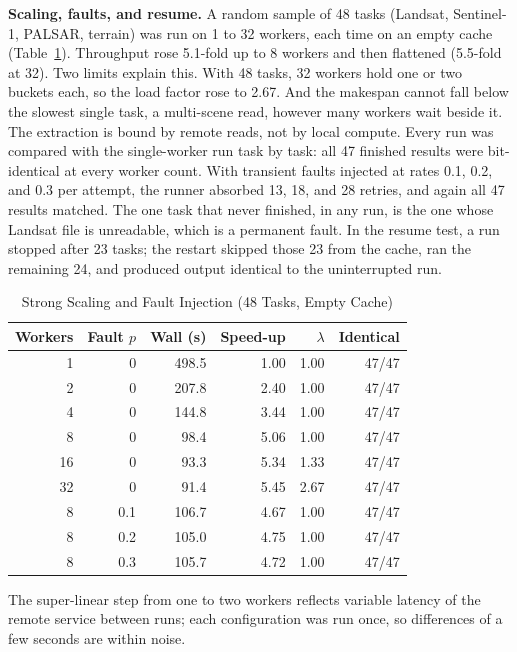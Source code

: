 \documentclass[conference,a4paper]{IEEEtran}
\begin{document}
\textbf{Scaling, faults, and resume.} A random sample of 48 tasks (Landsat, Sentinel-1, PALSAR, terrain) was run on 1 to 32 workers, each time on an empty cache (Table~\ref{tab:sys}). Throughput rose 5.1-fold up to 8 workers and then flattened (5.5-fold at 32). Two limits explain this. With 48 tasks, 32 workers hold one or two buckets each, so the load factor rose to 2.67. And the makespan cannot fall below the slowest single task, a multi-scene read, however many workers wait beside it. The extraction is bound by remote reads, not by local compute. Every run was compared with the single-worker run task by task: all 47 finished results were bit-identical at every worker count. With transient faults injected at rates 0.1, 0.2, and 0.3 per attempt, the runner absorbed 13, 18, and 28 retries, and again all 47 results matched. The one task that never finished, in any run, is the one whose Landsat file is unreadable, which is a permanent fault. In the resume test, a run stopped after 23 tasks; the restart skipped those 23 from the cache, ran the remaining 24, and produced output identical to the uninterrupted run.

\begin{table}[t]
\centering
\caption{Strong Scaling and Fault Injection (48 Tasks, Empty Cache)}
\label{tab:sys}
\footnotesize
\setlength{\tabcolsep}{4pt}
\begin{tabular}{@{}r r r r r r@{}}
\toprule
\textbf{Workers} & \textbf{Fault $p$} & \textbf{Wall (s)} & \textbf{Speed-up} & $\lambda$ & \textbf{Identical}\\
\midrule
1 & 0 & 498.5 & 1.00 & 1.00 & 47/47\\
2 & 0 & 207.8 & 2.40 & 1.00 & 47/47\\
4 & 0 & 144.8 & 3.44 & 1.00 & 47/47\\
8 & 0 & 98.4 & 5.06 & 1.00 & 47/47\\
16 & 0 & 93.3 & 5.34 & 1.33 & 47/47\\
32 & 0 & 91.4 & 5.45 & 2.67 & 47/47\\
\midrule
8 & 0.1 & 106.7 & 4.67 & 1.00 & 47/47\\
8 & 0.2 & 105.0 & 4.75 & 1.00 & 47/47\\
8 & 0.3 & 105.7 & 4.72 & 1.00 & 47/47\\
\bottomrule
\end{tabular}
\end{table}

The super-linear step from one to two workers reflects variable latency of the remote service between runs; each configuration was run once, so differences of a few seconds are within noise.
\end{document}
